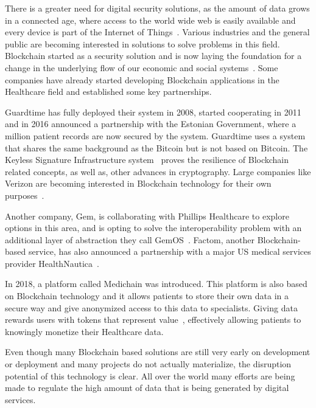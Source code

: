 There is a greater need for digital security solutions, as the amount of data
grows in a connected age, where access to the world wide web is easily
available and every device is part of the Internet of
Things~\cite{internetThings2018}.  Various industries and the general public
are becoming interested in solutions to solve problems in this field.
Blockchain started as a security solution and is now laying the foundation for
a change in the underlying flow of our economic and social
systems~\cite{Zago2018,Marr2018,Long2018}. Some companies have already started
developing Blockchain applications in the Healthcare field and established some
key partnerships.

Guardtime has fully deployed their system in 2008, started cooperating in 2011
and in 2016 announced a partnership with the Estonian Government, where a
million patient records are now secured by the system. Guardtime uses a system
that shares the same background as the Bitcoin but is not based on Bitcoin. The
Keyless Signature Infrastructure system~\cite{guardtimeKSI2018} proves the
resilience of Blockchain related concepts, as well as, other advances in
cryptography. Large companies like Verizon are becoming interested in
Blockchain technology for their own
purposes~\cite{GuardTime2018,EstonianGovernmentGuardTime2016}.

Another company, Gem, is collaborating with Phillips Healthcare to explore
options in this area\cite{philips2016}, and is opting to solve the
interoperability problem with an additional layer of abstraction they call
GemOS~\cite{gemOS2018}. Factom, another Blockchain-based service, has also
announced a partnership with a major US medical services provider
HealthNautica~\cite{BlockchainCompHealth2017,FactomPartnership2017}.

In 2018, a platform called Medichain was introduced. This platform is also
based on Blockchain technology and it allows patients to store their own data
in a secure way and give anonymized access to this data to specialists. Giving
data rewards users with tokens that represent value~\cite{MediChain2018},
effectively allowing patients to knowingly monetize their Healthcare data.

Even though many Blockchain based solutions are still very early on development
or deployment and many projects do not actually materialize, the disruption
potential of this technology is clear. All over the world many efforts are
being made to regulate the high amount of data that is being generated by
digital services.

